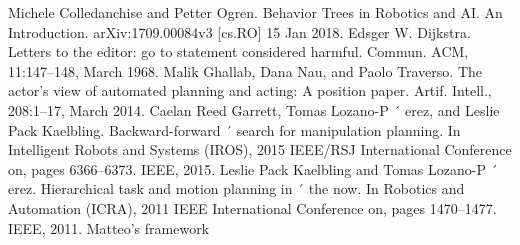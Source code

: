 \documentclass[letterpaper, 10 pt, conference]{ieeeconf}  %
\begin{document}
\begin{thebibliography}{99}

 Michele Colledanchise and Petter Ogren. Behavior Trees in Robotics and AI. An Introduction. arXiv:1709.00084v3 [cs.RO] 15 Jan 2018.
 Edsger W. Dijkstra. Letters to the editor: go to statement considered harmful. Commun. ACM, 11:147–148, March 1968.
 Malik Ghallab, Dana Nau, and Paolo Traverso. The actor’s view of automated planning and acting: A position paper. Artif. Intell., 208:1–17, March 2014.
 Caelan Reed Garrett, Tomas Lozano-P ´ erez, and Leslie Pack Kaelbling. Backward-forward ´ search for manipulation planning. In Intelligent Robots and Systems (IROS), 2015 IEEE/RSJ International Conference on, pages 6366–6373. IEEE, 2015.
 Leslie Pack Kaelbling and Tomas Lozano-P ´ erez. Hierarchical task and motion planning in ´ the now. In Robotics and Automation (ICRA), 2011 IEEE International Conference on, pages 1470–1477. IEEE, 2011.
Matteo's framework



\end{thebibliography}
\end{document}
